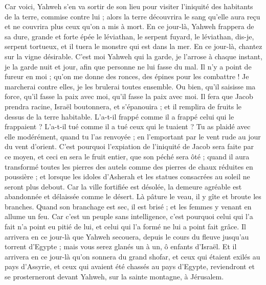 \begin{multicols}{2}
Car voici, Yahweh s'en va sortir de son lieu pour visiter l'iniquité des habitants de la terre, commise contre lui ; alors la terre découvrira le sang qu'elle aura reçu et ne couvrira plus ceux qu'on a mis à mort.
\VerseOne{}En ce jour-là, Yahweh frappera de sa dure, grande et forte épée le léviathan, le serpent fuyard, le léviathan, dis-je, serpent tortueux, et il tuera le monstre qui est dans la mer.
En ce jour-là, chantez sur la vigne désirable.
C'est moi Yahweh qui la garde, je l'arrose à chaque instant, je la garde nuit et jour, afin que personne ne lui fasse du mal.
Il n'y a point de fureur en moi ; qu'on me donne des ronces, des épines pour les combattre ! Je marcherai contre elles, je les brulerai toutes ensemble.
Ou bien, qu'il saisisse ma force, qu'il fasse la paix avec moi, qu'il fasse la paix avec moi.
Il fera que Jacob prendra racine, Israël  boutonnera, et s'épanouira ; et il remplira de fruits le dessus de la terre habitable.
L'a-t-il frappé comme il a frappé celui qui le frappaient ? L'a-t-il tué comme il a tué ceux qui le tuaient ?
Tu as plaidé avec elle modérément, quand tu l'as renvoyée ; en l'emportant par le vent rude au jour du vent d'orient.
C'est pourquoi l'expiation de l'iniquité de Jacob sera faite par ce moyen, et ceci en sera le fruit entier, que son péché sera ôté ; quand il aura transformé toutes les pierres des autels comme des pierres de chaux réduites en poussière ; et lorsque les idoles d'Asherah et les statues consacrées au soleil ne seront plus debout.
Car la ville fortifiée est désolée, la demeure agréable est abandonnée et délaissée comme le désert. Là pâture le veau, il y gîte et broute les branches.
Quand son branchage est sec, il est brisé ; et les femmes y venant en allume un feu. Car c'est un peuple sans intelligence,  c'est pourquoi celui qui l'a fait n'a point eu pitié de lui, et celui qui l'a formé ne lui a point fait grâce.
Il arrivera en ce jour-là que Yahweh secouera, depuis le cours du fleuve jusqu'au torrent d'Egypte ; mais vous serez glanés un à un, ô enfants d'Israël.
Et il arrivera en ce jour-là qu'on sonnera du grand shofar, et ceux qui étaient exilés au pays d'Assyrie, et ceux qui avaient été chassés au pays d'Egypte, reviendront et se prosterneront devant Yahweh, sur la sainte montagne, à Jérusalem.

\end{multicols}
